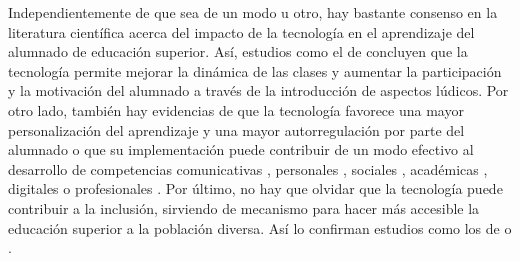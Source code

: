 Independientemente de que sea de un modo u otro, hay bastante consenso
en la literatura científica acerca del impacto de la tecnología en el
aprendizaje del alumnado de educación superior. Así, estudios como el de
\textcite{juanllamas2022} concluyen que la tecnología permite
mejorar la dinámica de las clases y aumentar la participación y la
motivación del alumnado a través de la introducción de aspectos lúdicos.
Por otro lado, también hay evidencias de que la tecnología favorece una
mayor personalización del aprendizaje y una mayor autorregulación por
parte del alumnado \cite{sáez-delgado_parra_jara-coatt_mella-norambuena_lópez-angulo_2023} o que su implementación
puede contribuir de un modo efectivo al desarrollo de competencias
comunicativas \cite{mesarave2023}, personales \cite{guerrero2023},
sociales \cite{garcia2022}, académicas \cite{cabrera2023},
digitales \cite{cupido2022} o profesionales \cite{gabarda2021b}. Por último, no hay que olvidar que la tecnología puede
contribuir a la inclusión, sirviendo de mecanismo para hacer más
accesible la educación superior a la población diversa. Así lo confirman
estudios como los de \textcite{fernandezcerero2024} o
\textcite{fernandezbatanero2023}.